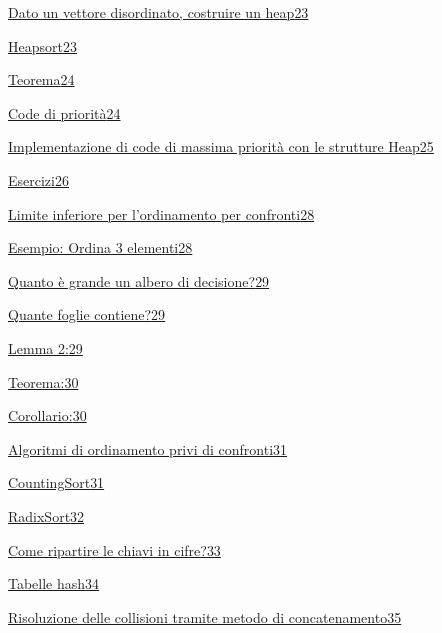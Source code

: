 \documentclass{article}
\begin{document}
{\protect\hyperlink{h.symae1e4ut5b}{Dato un vettore disordinato, costruire un heap}}{\protect\hyperlink{h.symae1e4ut5b}{23}}

{\protect\hyperlink{h.vi4eu8p6i55e}{Heapsort}}{\protect\hyperlink{h.vi4eu8p6i55e}{23}}

{\protect\hyperlink{h.rdu8s741ww8w}{Teorema}}{\protect\hyperlink{h.rdu8s741ww8w}{24}}

{\protect\hyperlink{h.jih9riph7gns}{Code di priorità}}{\protect\hyperlink{h.jih9riph7gns}{24}}

{\protect\hyperlink{h.aocay3iqens1}{Implementazione di code di massima priorità con le strutture Heap}}{\protect\hyperlink{h.aocay3iqens1}{25}}

{\protect\hyperlink{h.r8bopy9q4g8f}{Esercizi}}{\protect\hyperlink{h.r8bopy9q4g8f}{26}}

{\protect\hyperlink{h.7gslm72cwwxs}{Limite inferiore per l'ordinamento per confronti}}{\protect\hyperlink{h.7gslm72cwwxs}{28}}

{\protect\hyperlink{h.oynrnvh2y1cp}{Esempio: Ordina 3 elementi}}{\protect\hyperlink{h.oynrnvh2y1cp}{28}}

{\protect\hyperlink{h.prflgx3s7s1g}{Quanto è grande un albero di decisione?}}{\protect\hyperlink{h.prflgx3s7s1g}{29}}

{\protect\hyperlink{h.cphw2k3mqktf}{Quante foglie contiene?}}{\protect\hyperlink{h.cphw2k3mqktf}{29}}

{\protect\hyperlink{h.yiy1tipj4aof}{Lemma 2:}}{\protect\hyperlink{h.yiy1tipj4aof}{29}}

{\protect\hyperlink{h.hr66c3ikhdcj}{Teorema:}}{\protect\hyperlink{h.hr66c3ikhdcj}{30}}

{\protect\hyperlink{h.emyylm3q4aq8}{Corollario:}}{\protect\hyperlink{h.emyylm3q4aq8}{30}}

{\protect\hyperlink{h.p17586cst16}{Algoritmi di ordinamento privi di confronti}}{\protect\hyperlink{h.p17586cst16}{31}}

{\protect\hyperlink{h.bfk18jaq5ar4}{CountingSort}}{\protect\hyperlink{h.bfk18jaq5ar4}{31}}

{\protect\hyperlink{h.ixohzh3ypk6v}{RadixSort}}{\protect\hyperlink{h.ixohzh3ypk6v}{32}}

{\protect\hyperlink{h.u6e4yemegdiq}{Come ripartire le chiavi in cifre?}}{\protect\hyperlink{h.u6e4yemegdiq}{33}}

{\protect\hyperlink{h.1gvh3qlqsocy}{Tabelle hash}}{\protect\hyperlink{h.1gvh3qlqsocy}{34}}

{\protect\hyperlink{h.ocrobrrshwsz}{Risoluzione delle collisioni tramite metodo di concatenamento}}{\protect\hyperlink{h.ocrobrrshwsz}{35}}
\end{document}
